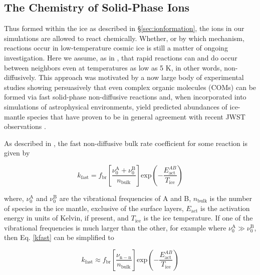 \documentclass[journal=aesccq,manuscript=article,layout=twocolumn]{achemso}
\begin{document}
\subsection{The Chemistry of Solid-Phase Ions}\label{sec:ionchem}

Thus formed within the ice as described in \S\ref{sec:ionformation}, the ions in our simulations are allowed to react chemically. Whether, or by which mechanism, reactions occur in low-temperature cosmic ice is still a matter of ongoing investigation. Here we assume, as in \citet{shingledecker_simulating_2019}, that rapid reactions can and do occur between neighbors even at temperatures as low as 5 K, in other words, non-diffusively. This approach was motivated by a now large body of experimental studies showing persuasively that even complex organic molecules (COMs) can be formed via fast solid-phase non-diffusive reactions \citep{abplanalp_study_2016,doddipatla_low-temperature_2021,bergantini_combined_2018,jin_formation_2020,mullikin_condensed-phase_2018,ghesquiere_reactivity_2018} and, when incorporated into simulations of astrophysical environments, yield predicted abundances of ice-mantle species that have proven to be in general agreement with recent JWST observations \citep{shingledecker_efficient_2020,mcclure_ice_2023,yang_corinos_2022}. 

As described in \citet{shingledecker_simulating_2019}, the fast non-diffusive bulk rate coefficient for some reaction  is given by

\begin{equation}
    k_\mathrm{fast} = f_\mathrm{br}\left[\frac{\nu_0^\mathrm{A} + \nu_0^\mathrm{B}}{n_\mathrm{bulk}} \right] \mathrm{exp}\left( - \frac{E_\mathrm{act}^{AB}}{T_\mathrm{ice}}\right)
    \label{kfast}
\end{equation}

\noindent
where, $\nu_0^\mathrm{A}$ and $\nu_0^\mathrm{B}$ are the vibrational frequencies of A and B, $n_\mathrm{bulk}$ is the number of species in the ice mantle, exclusive of the surface layers, $E_\mathrm{act}$ is the activation energy in units of Kelvin, if present, and $T_\mathrm{ice}$ is the ice temperature. If one of the vibrational frequencies is much larger than the other, for example where $\nu_0^\mathrm{A} \gg \nu_0^\mathrm{B}$, then Eq. \eqref{kfast} can be simplified to

\begin{equation}
    k_\mathrm{fast} \approx f_\mathrm{br}\left[\frac{\nu_\mathrm{n-n}}{n_\mathrm{bulk}} \right] \mathrm{exp}\left( - \frac{E_\mathrm{act}^{AB}}{T_\mathrm{ice}}\right)
    \label{kfast2}
\end{equation}
\end{document}
